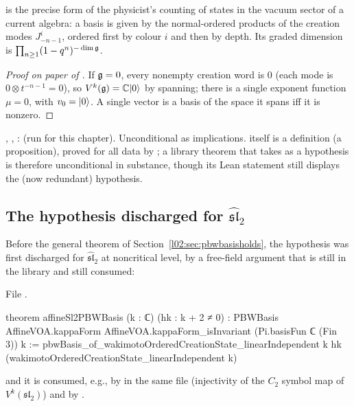 \begin{physics}
 is the precise form of the physicist's counting of states in the vacuum sector of a
current algebra: a basis is given by the normal-ordered products of the creation modes
$J^{i}_{-n-1}$, ordered first by colour $i$ and then by depth. Its graded dimension is
$\prod_{n\ge1}(1-q^n)^{-\dim\mathfrak{g}}$.
\end{physics}

\begin{proof}[Proof on paper of \allowbreak{}\allowbreak{}\allowbreak{}]
If $\mathfrak{g} = 0$, every nonempty creation word is $0$ (each mode is $0\otimes t^{-n-1} = 0$), so
$V^k(\mathfrak{g}) = {\mathbb{C}}|0\rangle$ by spanning; there is a single exponent function $\mu = 0$, with $v_0 = |0\rangle$.
A single vector is a basis of the space it spans iff it is nonzero.
\end{proof}

\begin{status}
\allowbreak{}\allowbreak{}, \allowbreak{}\allowbreak{}\allowbreak{}\allowbreak{},
\allowbreak{}\allowbreak{}\allowbreak{}\allowbreak{}:  (run for this
chapter). Unconditional as implications.  itself is a definition (a proposition), proved
for all data by ; a library theorem that takes  as a
hypothesis is therefore unconditional in substance, though its Lean statement still displays the (now
redundant) hypothesis.
\end{status}

\subsection{The hypothesis discharged for \texorpdfstring{$\widehat{\mathfrak{sl}}_2$}{affine sl2}}

Before the general theorem of Section~\ref{l02:sec:pbwbasisholds}, the hypothesis was first discharged
for $\widehat{\mathfrak{sl}}_2$ at noncritical level, by a free-field argument that is still in the library
and still consumed:

File .
\begin{leancode}
theorem affineSl2PBWBasis (k : ℂ) (hk : k + 2 ≠ 0) :
    PBWBasis AffineVOA.kappaForm AffineVOA.kappaForm_isInvariant
      (Pi.basisFun ℂ (Fin 3)) k :=
  pbwBasis_of_wakimotoOrderedCreationState_linearIndependent k hk
    (wakimotoOrderedCreationState_linearIndependent k)
\end{leancode}
and it is consumed, e.g., by \allowbreak{}\allowbreak{} in the same file (injectivity of the
$C_2$ symbol map of $V^k(\mathfrak{sl}_2)$) and by .

